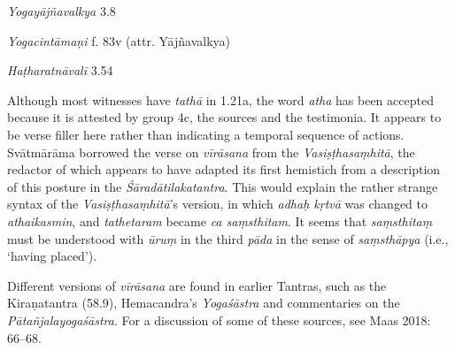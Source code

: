 \begin{ekdosis}
\begin{sources}[hp01_021]
\emph{Yogayājñavalkya} 3.8

\begin{versinnote}
\end{versinnote}

\end{sources}

\begin{testimonia}[hp01_021]
\emph{Yogacintāmaṇi} f. 83v (attr. Yājñavalkya)

\begin{versinnote}
\end{versinnote}

\emph{Haṭharatnāvalī} 3.54

\begin{versinnote}
\tl{\var{sthiram ] sthitam T}\\!}
\end{versinnote}

\end{testimonia}

\begin{philcomm}[hp01_021]   
Although most witnesses have \emph{tathā} in 1.21a, the word \emph{atha} has been accepted because it is attested by group 4c, the sources and the testimonia. It appears to be verse filler here rather than indicating a temporal sequence of actions. Svātmārāma borrowed the verse on \emph{vīrāsana} from the \emph{Vasiṣṭhasaṃhitā}, the redactor of which appears to have adapted its first hemistich from a description of this posture in the \emph{Śāradātilakatantra}. This would explain the rather strange syntax of the \emph{Vasiṣṭhasaṃhitā}’s version, in which \emph{adhaḥ kṛtvā} was changed to \emph{athaikasmin}, and \emph{tathetaram} became \emph{ca saṃsthitam}. It seems that \emph{saṃsthitaṃ} must be understood with \emph{ūruṃ} in the third \emph{pāda} in the sense of \emph{saṃsthāpya} (i.e., ‘having placed’).

Different versions of \emph{vīrāsana} are found in earlier Tantras, such as the Kiraṇatantra (58.9), Hemacandra’s \emph{Yogaśāstra} and commentaries on the \emph{Pātañjalayogaśāstra}. For a discussion of some of these sources, see Maas 2018: 66–68.
\end{philcomm}


\end{ekdosis}
